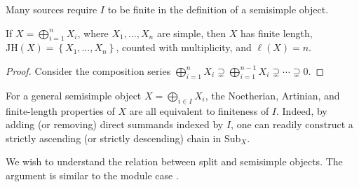Many sources require $I$ to be finite in the definition of a semisimple
object.

\begin{lemma}
	If $X=\bigoplus_{i=1}^nX_i$, where $X_1,\ldots,X_n$ are simple, then $X$
	has finite length,
	$\mathrm{JH}(X)=\left\{X_1,\ldots,X_n\right\}$, counted with multiplicity, and
	$\ell(X)=n$.
\end{lemma}
\begin{proof}
	Consider the composition series
	$\bigoplus_{i=1}^nX_i\supsetneq\bigoplus_{i=1}^{n-1}X_i\supsetneq\cdots
	\supsetneq0$.
\end{proof}

\begin{remark}
	For a general semisimple object $X=\bigoplus_{i\in I}X_i$, the
	Noetherian, Artinian, and finite-length properties of $X$ are all
	equivalent to finiteness of $I$. Indeed, by adding (or removing) direct
	summands indexed by $I$, one can readily construct a strictly ascending
	(or strictly descending) chain in $\mathrm{Sub}_X$.
\end{remark}

We wish to understand the relation between split and semisimple objects. The
argument is similar to the module case \cite[Proposition 6.11.4]{Li1}.

